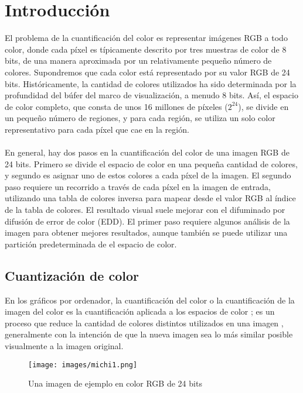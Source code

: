 \section{Introducción}
El problema de la cuantificación del color es representar imágenes RGB a todo color, donde cada píxel es típicamente descrito por tres muestras de color de 8 bits, de una manera aproximada por un relativamente pequeño número de colores. Supondremos que cada color está representado por su valor RGB de 24 bits. Históricamente, la cantidad de colores utilizados ha sido determinada por la profundidad del búfer del marco de visualización, a menudo 8 bits. Así, el espacio de color completo, que consta de unos 16 millones de píxeles ($2^{24}$), se divide en un pequeño número de regiones, y para cada región, se utiliza un solo color representativo para cada píxel que cae en la región.\\
\\
En general, hay dos pasos en la cuantificación del color de una imagen RGB de 24 bits. Primero se divide el espacio de color en una pequeña cantidad de colores, y segundo es asignar uno de estos colores a cada píxel de la imagen. El segundo paso requiere un recorrido a través de cada píxel en la imagen de entrada, utilizando una tabla de colores inversa para mapear desde el valor RGB al índice de la tabla de colores. El resultado visual suele mejorar con el difuminado por difusión de error de color (EDD). El primer paso requiere algunos análisis de la imagen para obtener mejores resultados, aunque también se puede utilizar una partición predeterminada de el espacio de color.

\subsection{Cuantización de color}
En los gráficos por ordenador, la cuantificación del color o la cuantificación de la imagen del color es la cuantificación aplicada a los espacios de color ; es un proceso que reduce la cantidad de colores distintos utilizados en una imagen , generalmente con la intención de que la nueva imagen sea lo más similar posible visualmente a la imagen original.

\begin{figure}[H]
  \centering
  \texttt{[image: images/michi1.png]}
  \caption{Una imagen de ejemplo en color RGB de 24 bits}
  \label{fig:act-3}
\end{figure}

